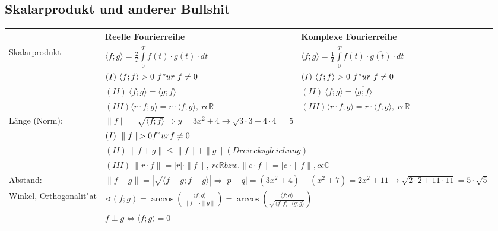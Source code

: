   \subsection{Skalarprodukt und anderer Bullshit}
  \begin{tabular}{|p{3cm}|p{7cm}|p{7cm}|}
    \hline
    & Reelle Fourierreihe & Komplexe Fourierreihe \\
    \hline
    Skalarprodukt &  $\langle f;g \rangle = \frac{2}{T}\int\limits_0^Tf(t)\cdot
    g(t)\cdot dt $ & $\langle f;g \rangle = \frac{1}{T}\int\limits_0^Tf(t)\cdot
    \overline{g(t)}\cdot dt $ \\
    & $(I)\ \langle f;f \rangle > 0\ f"ur\ f\neq 0$ &
    $(I)\ \langle f;f \rangle > 0\ f"ur\ f\neq 0$ \\
    & $(II)\ \langle f;g \rangle = \langle g;f \rangle $ &
    $(II)\ \langle f;g \rangle = \overline{\langle g;f \rangle} $ \\
    & $(III) \langle r\cdot f;g\rangle = r\cdot\langle f;g\rangle,\ r\epsilon
    \mathbb R$ & $(III) \langle r\cdot f;g\rangle = r\cdot\langle f;g\rangle,\ 
    r\epsilon \mathbb R$
    \\
    \hline
    Länge (Norm): & \multicolumn{2}{|l|}{
    $\parallel f \parallel = \sqrt{\langle
    f;f \rangle} \Rightarrow y=3x^2+4 \rightarrow \sqrt{3\cdot3+4\cdot4}=5$ 
    } \\
    & \multicolumn{2}{|l|}{ $ (I)\ \parallel f \parallel > 0 f"ur f \neq 0$} \\
    & \multicolumn{2}{|l|}{ $ (II)\ \parallel f+g \parallel \leq \parallel f
    \parallel + \parallel g \parallel (Dreiecksgleichung)$} \\
    & \multicolumn{2}{|l|}{ $ (III)\ \parallel r\cdot f \parallel = |r| \cdot
    \parallel f \parallel , \ r \epsilon \mathbb R bzw. \parallel c\cdot
    f\parallel = |c|\cdot \parallel f \parallel, c\epsilon\mathbb C$} \\
    \hline
    Abstand: & \multicolumn{2}{|l|}{ $ \parallel f-g \parallel =
    |\sqrt{\langle f-g;f-g \rangle}| \Rightarrow
    |p-q|=(3x^2+4)-(x^2+7)=2x^2+11 \rightarrow
    \sqrt{2\cdot2+11\cdot11}=5\cdot\sqrt{5}$}
    \\
    \hline
    Winkel, Orthogonalit"at &
    \multicolumn{2}{|l|}{
    $\sphericalangle(f;g)=\arccos\left( \frac{\langle f;g \rangle}{\parallel f
    \parallel \cdot \parallel g \parallel} \right) = \arccos\left(\frac{\langle f;g 
    \rangle}{\sqrt{\langle f;f\rangle \cdot \langle g;g\rangle}}\right)$} \\
     & \multicolumn{2}{|l|}{$f \perp g\Leftrightarrow \langle f;g \rangle = 0$}
     \\
    
    
    \hline
    
  \end{tabular}


